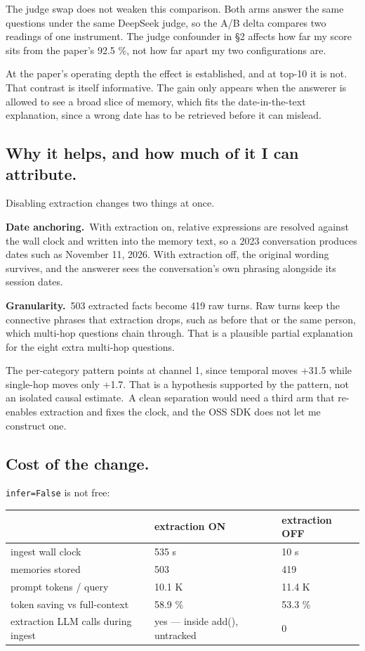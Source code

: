 \documentclass[11pt,a4paper]{article}
\begin{document}
The judge swap does not weaken this comparison. Both arms answer the same questions under the same DeepSeek judge, so the A/B delta compares two readings of one instrument. The judge confounder in §2 affects how far my score sits from the paper's 92.5 \%, not how far apart my two configurations are.

At the paper's operating depth the effect is established, and at top-10 it is not. That contrast is itself informative. The gain only appears when the answerer is allowed to see a broad slice of memory, which fits the date-in-the-text explanation, since a wrong date has to be retrieved before it can mislead.

\subsection{Why it helps, and how much of it I can attribute.}

Disabling extraction changes two things at once.

\textbf{Date anchoring.}~With extraction on, relative expressions are resolved against the wall clock and written into the memory text, so a 2023 conversation produces dates such as November 11, 2026. With extraction off, the original wording survives, and the answerer sees the conversation's own phrasing alongside its session dates.

\textbf{Granularity.}~503 extracted facts become 419 raw turns. Raw turns keep the connective phrases that extraction drops, such as before that or the same person, which multi-hop questions chain through. That is a plausible partial explanation for the eight extra multi-hop questions.

The per-category pattern points at channel 1, since temporal moves +31.5 while single-hop moves only +1.7. That is a hypothesis supported by the pattern, not an isolated causal estimate.~A clean separation would need a third arm that re-enables extraction and fixes the clock, and the OSS SDK does not let me construct one.

\subsection{Cost of the change.}

\texttt{infer=False} is not free:

\begin{center}\small
\begin{tabular}{@{}lll@{}}
\toprule
\textbf{} & \textbf{extraction ON} & \textbf{extraction OFF} \\
\midrule
ingest wall clock & 535 s & 10 s \\
memories stored & 503 & 419 \\
prompt tokens / query & 10.1 K & 11.4 K \\
token saving vs full-context & 58.9 \% & 53.3 \% \\
extraction LLM calls during ingest & yes --- inside add(), untracked & 0 \\
\bottomrule
\end{tabular}
\end{center}
\end{document}
